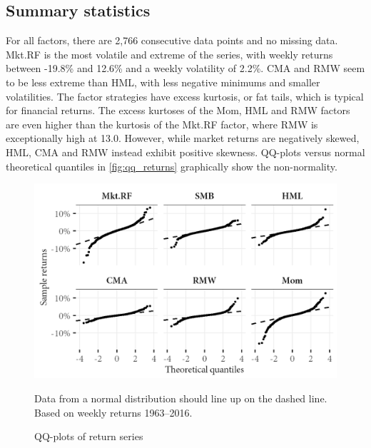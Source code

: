 \subsection{Summary statistics}



For all factors, there are 2,766 consecutive data points and no missing data. Mkt.RF is the most volatile and extreme of the series, with weekly returns between -19.8\% and 12.6\% and a weekly volatility of 2.2\%. CMA and RMW seem to be less extreme than HML, with less negative minimums and smaller volatilities. The factor strategies have excess kurtosis, or fat tails, which is typical for financial returns. The excess kurtoses of the Mom, HML and RMW factors are even higher than the kurtosis of the Mkt.RF factor, where RMW is exceptionally high at 13.0. However, while market returns are negatively skewed, HML, CMA and RMW instead exhibit positive skewness. QQ-plots versus normal theoretical quantiles in \autoref{fig:qq_returns} graphically show the non-normality.

\begin{figure}[ht!]
  \centering
  \footnotesize
  \includegraphics[scale=1]{graphics/qq_returns.png}
  \caption{QQ-plots of return series}
  \begin{longcaption}
    Data from a normal distribution should line up on the dashed line. Based on weekly returns 1963--2016.
  \end{longcaption}
  \label{fig:qq_returns}
\end{figure}

